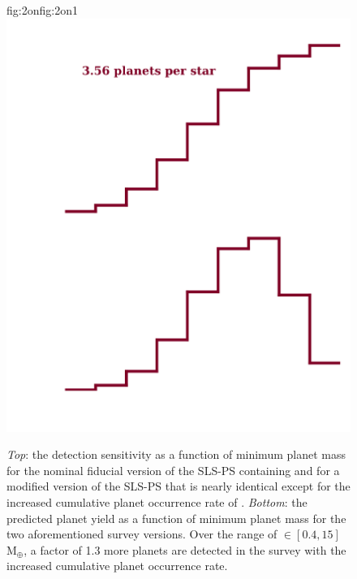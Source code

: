 \begin{figure}
\begin{ocg}{fig:2on}{fig:2on}{1}
    \includegraphics[width=0.6\hsize]{figures/2occ_opt_2.png}%
  \end{ocg}
  \hspace{-0.6\hsize}%
  \caption[Planet yield results in the SLS-PS with modified input occurrence rates.]
      {\small \emph{Top}: the detection sensitivity as a function of minimum planet mass
    for the nominal fiducial version of the SLS-PS containing 
     and for a
    modified version of the SLS-PS that is nearly identical except for the increased cumulative
    planet occurrence rate of
    .
    \emph{Bottom}: the predicted planet yield as a function of minimum planet mass
    for the two aforementioned survey versions. Over the range of \msini{} $\in [0.4,15]$
    M$_{\oplus}$, a factor of 1.3 more planets are detected in the survey with
    the increased cumulative planet occurrence rate.}
  \label{BSfig:2occ}
\end{figure}


